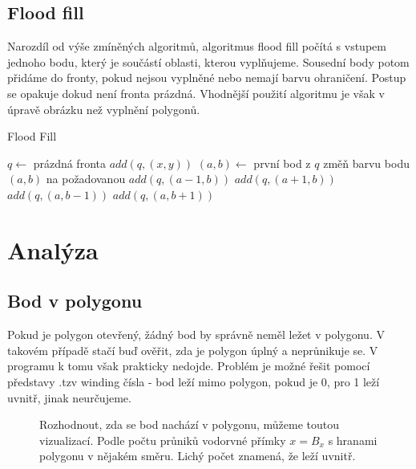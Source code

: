 \documentclass[a4paper,12pt]{report}
\begin{document}
\section{Flood fill}


Narozdíl od výše zmíněných algoritmů, algoritmus flood fill počítá s vstupem jednoho bodu, který je součástí oblasti, kterou vyplňujeme. Sousední body potom přidáme do fronty, pokud nejsou vyplněné nebo nemají barvu ohraničení. Postup se opakuje dokud není fronta prázdná.
Vhodnější použití  algoritmu je však v úpravě obrázku než vyplnění polygonů.


\begin{algorithm}[H]
\caption{Flood Fill}
\label{alg:floodfill}
\begin{algorithmic}
 
\State $q \gets$ prázdná fronta 
\State $add(q, (x,y))$ 
 
\State $(a,b) \gets$ první bod z $q$ 
\State změň barvu bodu $(a,b)$ na požadovanou
\State $add(q, (a-1,b))$ 
\EndIf
{}
\State $add(q, (a+1,b))$ 
\EndIf
{}
\State $add(q, (a,b-1))$ 
\EndIf
{}
\State $add(q, (a,b+1))$ 
\EndIf
\EndWhile
\EndProcedure
\end{algorithmic}
\end{algorithm}


\chapter{Analýza}
\section{Bod v polygonu}
\begin{multicols}{2}
Pokud je polygon otevřený, žádný bod by správně neměl ležet v polygonu. V takovém případě stačí buď ověřit, zda je polygon úplný a neprůnikuje se. V programu k tomu však prakticky nedojde. Problém je možné řešit pomocí představy .tzv winding čísla - bod leží mimo polygon, pokud je 0, pro 1 leží uvnitř, jinak neurčujeme.
  
\begin{figure}[H]
  \centering
  
  \caption{Rozhodnout, zda se bod nachází v polygonu, můžeme toutou vizualizací. Podle počtu průniků vodorvné přímky $x=B_x$ s hranami polygonu v nějakém směru. Lichý počet znamená, že leží uvnitř.}
\end{figure}


\end{multicols}
\end{document}

